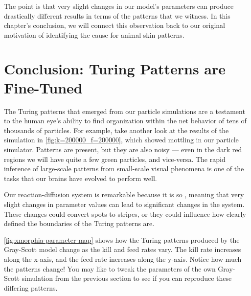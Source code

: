 The point is that very slight changes in our model's parameters can produce drastically different results in terms of the patterns that we witness. In this chapter's conclusion, we will connect this observation back to our original motivation of identifying the cause for animal skin patterns.\\

\FloatBarrier
{}

\section{Conclusion: Turing Patterns are Fine-Tuned}
\label{sec:conclusion:_turing_patterns_are_fine-tuned}

The Turing patterns that emerged from our particle simulations are a testament to the human eye's ability to find organization within the net behavior of tens of thousands of particles. For example, take another look at the results of the simulation in \autoref{fig:k=200000_f=200000}, which showed mottling in our particle simulator. Patterns are present, but they are also noisy --- even in the dark red regions we will have quite a few green particles, and vice-versa. The rapid inference of large-scale patterns from small-scale visual phenomena is one of the tasks that our brains have evolved to perform well.

Our reaction-diffusion system is remarkable because it is so , meaning that very slight changes in parameter values can lead to significant changes in the system. These changes could convert spots to stripes, or they could influence how clearly defined the boundaries of the Turing patterns are.

\autoref{fig:xmorphia-parameter-map} shows how the Turing patterns produced by the Gray-Scott model change as the kill and feed rates vary. The kill rate increases along the x-axis, and the feed rate increases along the y-axis. Notice how much the patterns change! You may like to tweak the parameters of the own Gray-Scott simulation from the previous section to see if you can reproduce these differing patterns.\\

